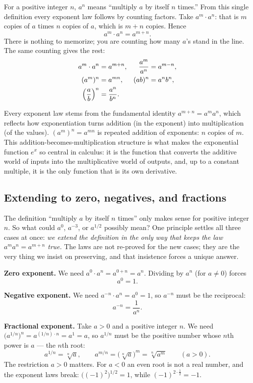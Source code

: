 For a positive integer $n$, $a^n$ means ``multiply $a$ by itself $n$ times.'' From
this single definition every exponent law follows by counting factors. Take
$a^m \cdot a^n$: that is $m$ copies of $a$ times $n$ copies of $a$, which is $m+n$
copies. Hence
\[
  a^m \cdot a^n = a^{m+n}.
\]
There is nothing to memorize; you are counting how many $a$'s stand in the
line. The same counting gives the rest:
\begin{align*}
  a^m \cdot a^n &= a^{m+n}, & \frac{a^m}{a^n} &= a^{m-n}, \\
  (a^m)^n &= a^{mn}, & (ab)^n &= a^n b^n, \\
  \Bigl(\frac{a}{b}\Bigr)^n &= \frac{a^n}{b^n}. & &
\end{align*}

\begin{happeningbox}
Every exponent law stems from the fundamental identity $a^{m+n}=a^m a^n$,
which reflects how exponentiation turns addition (in the exponent) into
multiplication (of the values). $(a^m)^n = a^{mn}$ is repeated addition of
exponents: $n$ copies of $m$. This addition-becomes-multiplication structure is
what makes the exponential function $e^x$ so central in calculus: it is
the function that converts the additive world of inputs into the multiplicative
world of outputs, and, up to a constant multiple, it is the only function that is
its own derivative.
\end{happeningbox}

\subsection{Extending to zero, negatives, and fractions}

The definition ``multiply $a$ by itself $n$ times'' only makes sense for positive
integer $n$. So what could $a^0$, $a^{-3}$, or $a^{1/2}$ possibly mean? One
principle settles all three cases at once: \emph{we extend the definition in the only way that
keeps the law $a^m a^n = a^{m+n}$ true.} The laws are not re-proved for the new
cases; they are the very thing we insist on preserving, and that insistence forces
a unique answer.

\textbf{Zero exponent.} We need $a^0 \cdot a^n = a^{0+n} = a^n$. Dividing by $a^n$
(for $a \neq 0$) forces
\[
  a^0 = 1.
\]

\textbf{Negative exponent.} We need $a^{-n} \cdot a^n = a^{0} = 1$, so $a^{-n}$
must be the reciprocal:
\[
  a^{-n} = \frac{1}{a^n}.
\]

\textbf{Fractional exponent.} Take $a > 0$ and a positive integer $n$. We need
$\bigl(a^{1/n}\bigr)^n = a^{(1/n)\cdot n} = a^1 = a$, so $a^{1/n}$ must be the
positive number whose $n$th power is $a$ --- the $n$th root:
\[
  a^{1/n} = \sqrt[n]{a}, \qquad a^{m/n} = \bigl(\sqrt[n]{a}\bigr)^m = \sqrt[n]{a^m}
  \qquad (a > 0).
\]
The restriction $a > 0$ matters. For $a < 0$ an even root is not a real number, and
the exponent laws break: $\bigl((-1)^2\bigr)^{1/2} = 1$, while
$(-1)^{2\cdot\frac12} = -1$.

